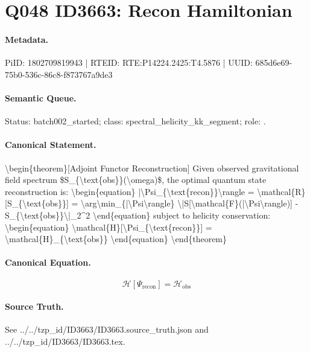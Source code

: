 \section*{Q048 ID3663: Recon Hamiltonian}
\paragraph{Metadata.}
PiID: 1802709819943 | RTEID: RTE:P14224.2425:T4.5876 | UUID: 685d6e69-75b0-536c-86c8-f873767a9de3

\paragraph{Semantic Queue.}
Status: batch002\_started; class: spectral\_helicity\_kk\_segment; role: .

\paragraph{Canonical Statement.}
\textbackslash{}begin\{theorem\}[Adjoint Functor Reconstruction] Given observed gravitational field spectrum \$S\_\{\textbackslash{}text\{obs\}\}(\textbackslash{}omega)\$, the optimal quantum state reconstruction is: \textbackslash{}begin\{equation\} |\textbackslash{}Psi\_\{\textbackslash{}text\{recon\}\}\textbackslash{}rangle = \textbackslash{}mathcal\{R\}[S\_\{\textbackslash{}text\{obs\}\}] = \textbackslash{}arg\textbackslash{}min\_\{|\textbackslash{}Psi\textbackslash{}rangle\} \textbackslash{}|S[\textbackslash{}mathcal\{F\}(|\textbackslash{}Psi\textbackslash{}rangle)] - S\_\{\textbackslash{}text\{obs\}\}\textbackslash{}|\_2\textasciicircum{}2 \textbackslash{}end\{equation\} subject to helicity conservation: \textbackslash{}begin\{equation\} \textbackslash{}mathcal\{H\}[\textbackslash{}Psi\_\{\textbackslash{}text\{recon\}\}] = \textbackslash{}mathcal\{H\}\_\{\textbackslash{}text\{obs\}\} \textbackslash{}end\{equation\} \textbackslash{}end\{theorem\}

\paragraph{Canonical Equation.}
\[
\begin{equation} \mathcal{H}[\Psi_{\text{recon}}] = \mathcal{H}_{\text{obs}} \end{equation}
\]

\paragraph{Source Truth.}
See ../../tzp\_id/ID3663/ID3663.source\_truth.json and ../../tzp\_id/ID3663/ID3663.tex.
